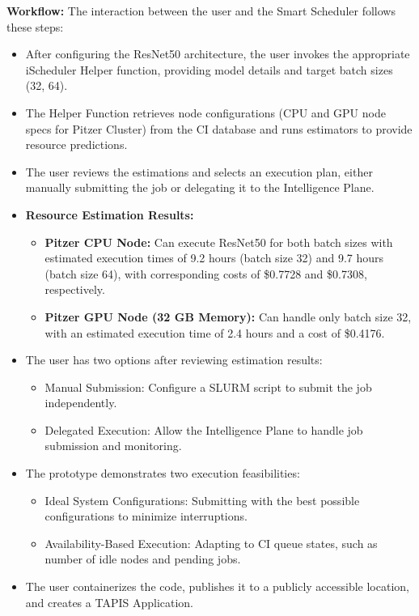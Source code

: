 \textbf{Workflow:} The interaction between the user and the Smart Scheduler follows these steps:
\begin{itemize}
    \item After configuring the ResNet50 architecture, the user invokes the appropriate iScheduler Helper function, providing model details and target batch sizes (32, 64).
    \item The Helper Function retrieves node configurations (CPU and GPU node specs for Pitzer Cluster) from the CI database and runs estimators to provide resource predictions.
    \item The user reviews the estimations and selects an execution plan, either manually submitting the job or delegating it to the Intelligence Plane. 
    \item \textbf{Resource Estimation Results:}
    \begin{itemize}
        \item \textbf{Pitzer CPU Node:} Can execute ResNet50 for both batch sizes with estimated execution times of 9.2 hours (batch size 32) and 9.7 hours (batch size 64), with corresponding costs of \$0.7728 and \$0.7308, respectively.
        \item \textbf{Pitzer GPU Node (32 GB Memory):} Can handle only batch size 32, with an estimated execution time of 2.4 hours and a cost of \$0.4176.
    \end{itemize}
    \item The user has two options after reviewing estimation results:
    \begin{itemize}
        \item Manual Submission: Configure a SLURM script to submit the job independently.
        \item Delegated Execution: Allow the Intelligence Plane to handle job submission and monitoring.
    \end{itemize}
    \item The prototype demonstrates two execution feasibilities:
    \begin{itemize}
        \item Ideal System Configurations: Submitting with the best possible configurations to minimize interruptions.
        \item Availability-Based Execution: Adapting to CI queue states, such as number of idle nodes and pending jobs.
    \end{itemize}
    \item The user containerizes the code, publishes it to a publicly accessible location, and creates a TAPIS Application.

\end{itemize}
